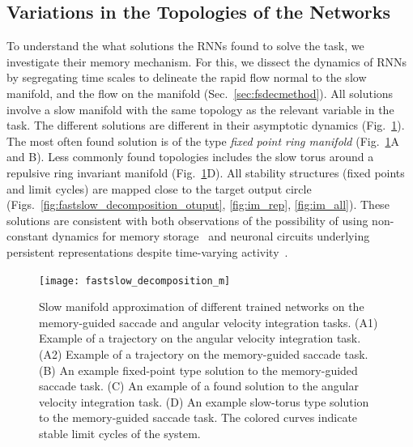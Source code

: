 \documentclass{article} %
\newcounter{ct}
\theoremstyle{definition}
\theoremstyle{remark}
\begin{document}
\subsection{Variations in the Topologies of the Networks}\label{sec:topologies}
To understand the what solutions the RNNs found to solve the task, we investigate their memory mechanism.
For this, we dissect the dynamics of RNNs by segregating time scales to delineate the rapid flow normal to the slow manifold, and the flow on the manifold (Sec.~\ref{sec:fsdecmethod}).
%
All solutions involve a slow manifold with the same topology as the relevant variable in the task.
The different solutions are different in their asymptotic dynamics (Fig.~\ref{fig:fastslow_decomposition}).
The most often found solution is of the type \emph{fixed point ring manifold} (Fig.~\ref{fig:fastslow_decomposition}A and B).
%
Less commonly found topologies includes %
the slow torus around a repulsive ring invariant manifold (Fig.~\ref{fig:fastslow_decomposition}D).
All stability structures (fixed points and limit cycles) are mapped close to the target output circle (Figs.~\ref{fig:fastslow_decomposition_otuput}, \ref{fig:im_rep}, \ref{fig:im_all}).
These solutions are consistent with both observations of the possibility of using non-constant dynamics for memory storage~\citep{hirsch1995computing, Park2023a} and neuronal circuits underlying persistent representations despite time-varying activity~\citep{druckmann2012neuronal}.

\begin{figure}[tbhp]
  \centering
  \texttt{[image: fastslow\_decomposition\_m]}
  \caption{Slow manifold approximation of different trained networks on the memory-guided saccade and angular velocity integration tasks.
 (A1) Example of a trajectory on the angular velocity integration task.
 (A2) Example of a trajectory on the memory-guided saccade task.
 (B) An example fixed-point type solution to the memory-guided saccade task.
 (C) An example of a found solution to the angular velocity integration task.
 (D) An example slow-torus type solution to the memory-guided saccade task. The colored curves indicate stable limit cycles of the system.
}\label{fig:fastslow_decomposition}
\end{figure}
\end{document}
